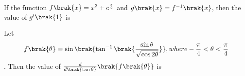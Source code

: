 \iffalse
\title{Assignment}
\author{Y.Harsha Vardhan Reddy}
\section{integer}
\fi
    \item If the function $f\brak{x}=x^3+e^{\frac{x}{2}}$ and $g\brak{x}=f^{-1}\brak{x}$, then the value of $g'\brak{1}$ is 
    \hfill{}
    \item    Let \begin{align}f\brak{\theta}=\sin{\brak{\tan^{-1}{\brak{\frac{\sin{\theta}}{\sqrt{\cos{2\theta}}}}}}} , where -\frac{\pi}{4}<\theta<\frac{\pi}{4}\end{align}. Then the value of $\frac{d}{d\brak{\tan{\theta}}}\brak{f\brak{\theta}}$ is
 
\hfill{}

